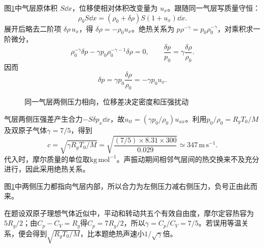 \begin{solution}
图\ref{fig:hw7-5-s}中气层原体积 $S\dd x$，位移使相对体积改变量为 $u_x$。跟随同一气层写质量守恒：
\[
\rho_0S\dd x=(\rho_0+\delta\rho)S(1+u_x)\dd x.
\]
展开后略去二阶项 $\delta\rho\,u_x$，得 $\delta\rho=-\rho_0u_x$。绝热关系为 $p\rho^{-\gamma}=p_0\rho_0^{-\gamma}$，对乘积求一阶微分，
\[
\rho_0^{-\gamma}\delta p-\gamma p_0\rho_0^{-\gamma-1}\delta\rho=0,
\qquad \frac{\delta p}{p_0}=\gamma\frac{\delta\rho}{\rho_0}.
\]
因而
\[
 \delta p=\gamma p_0\frac{\delta\rho}{\rho_0}=-\gamma p_0u_x.
\]

\begin{figure}[H]\centering
{}
\caption{同一气层两侧压力相向，位移差决定密度和压强扰动}\label{fig:hw7-5-s}
\end{figure}

气层两侧压强差产生合力$-S\delta p_x\dd x$，故$u_{tt}=(\gamma p_0/\rho_0)u_{xx}$。利用$p_0/\rho_0=R_gT_0/M$及双原子气体$\gamma=7/5$，得到
\[
 \boxed{c=\sqrt{\gamma R_gT_0/M}
 =\sqrt{\frac{(7/5)\times8.31\times300}{0.029}}
 \simeq347\,\mathrm{m\,s^{-1}}}.
\]
代入时，摩尔质量的单位取$\mathrm{kg\,mol^{-1}}$。声振动期间相邻气层间的热交换来不及充分进行，因此采用绝热关系。


图\ref{fig:hw7-5-s}中两侧压力都指向气层内部，所以合力为左侧压力减右侧压力，负号正由此而来。

在题设双原子理想气体近似中，平动和转动共五个有效自由度，摩尔定容热容为$5R_g/2$；由$C_p-C_V=R_g$得$C_p=7R_g/2$，所以$\gamma=C_p/C_V=7/5$。若误用等温关系，便会得到$\sqrt{R_gT_0/M}$，比本题绝热声速小$1/\sqrt\gamma$倍。

\end{solution}



